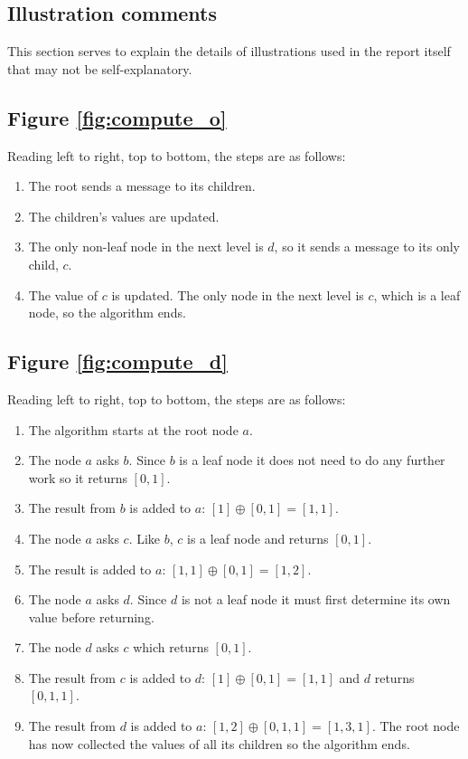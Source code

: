 \documentclass{article}
\begin{document}
\newpage
\begin{appendices}
\section{Illustration comments}
\label{appendix:illustrations}
This section serves to explain the details of illustrations used in the report itself that may not be self-explanatory.
\subsection{Figure \ref{fig:compute_o}}
\label{appendix:illustrations_compute_o}
Reading left to right, top to bottom, the steps are as follows:
\begin{enumerate}
	\item The root sends a message to its children.
	\item The children's values are updated.
	\item The only non-leaf node in the next level is $d$, so it sends a message to its only child, $c$.
	\item The value of $c$ is updated. The only node in the next level is $c$, which is a leaf node, so the algorithm ends.
\end{enumerate}


\subsection{Figure \ref{fig:compute_d}}
\label{appendix:illustrations_compute_d}
Reading left to right, top to bottom, the steps are as follows:
\begin{enumerate}
	\item The algorithm starts at the root node $a$.
	\item The node $a$ asks $b$. Since $b$ is a leaf node it does not need to do any further work so it returns $[0, 1]$.
	\item The result from $b$ is added to $a$: $[1] \oplus [0,1] = [1,1]$.
	\item The node $a$ asks $c$. Like $b$, $c$ is a leaf node and returns $[0,1]$.
	\item The result is added to $a$: $[1,1] \oplus [0,1] = [1,2]$.
	\item The node $a$ asks $d$. Since $d$ is not a leaf node it must first determine its own value before returning.
	\item The node $d$ asks $c$ which returns $[0,1]$.
	\item The result from $c$ is added to $d$: $[1] \oplus [0,1] = [1,1]$ and $d$ returns $[0,1,1]$.
	\item The result from $d$ is added to $a$: $[1,2]\oplus[0,1,1]=[1,3,1]$. The root node has now collected the values of all its children so the algorithm ends.
\end{enumerate}


\end{appendices}
\end{document}
